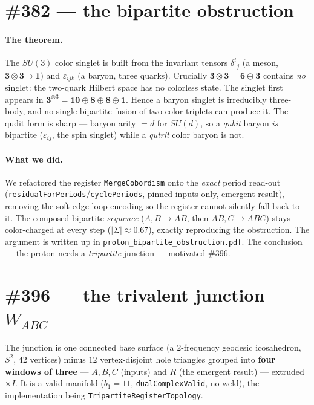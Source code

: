 \documentclass[11pt]{article}
\newcommand{\rep}[1]{\mathbf{#1}}
\newcommand{\triv}{\mathbf{1}}
\newcommand{\Sg}{\Sigma}
\newcommand{\code}[1]{\texttt{#1}}
\begin{document}
\section{\#382 --- the bipartite obstruction}

\paragraph{The theorem.} The $SU(3)$ color singlet is built from the invariant
tensors $\delta^i{}_j$ (a meson, $\rep 3\otimes\bar{\rep 3}\supset\triv$) and
$\varepsilon_{ijk}$ (a baryon, three quarks). Crucially
$\rep 3\otimes\rep 3=\rep 6\oplus\bar{\rep 3}$ contains \emph{no} singlet: the
two-quark Hilbert space has no colorless state. The singlet first appears in
$\rep 3^{\otimes 3}=\rep{10}\oplus\rep 8\oplus\rep 8\oplus\triv$. Hence a baryon
singlet is irreducibly three-body, and no single bipartite fusion of two color
triplets can produce it. The qudit form is sharp --- baryon arity $=d$ for
$SU(d)$, so a \emph{qubit} baryon \emph{is} bipartite ($\varepsilon_{ij}$, the
spin singlet) while a \emph{qutrit} color baryon is not.

\paragraph{What we did.} We refactored the register \code{MergeCobordism} onto the
\emph{exact} period read-out (\code{residualForPeriods}/\code{cyclePeriods}, pinned
inputs only, emergent result), removing the soft edge-loop encoding so the register
cannot silently fall back to it. The composed bipartite \emph{sequence}
($A,B\!\to\!AB$, then $AB,C\!\to\!ABC$) stays color-charged at every step
($|\Sg|\approx 0.67$), exactly reproducing the obstruction. The argument is
written up in \code{proton\_bipartite\_obstruction.pdf}. The conclusion --- the
proton needs a \emph{tripartite} junction --- motivated \#396.

\section{\#396 --- the trivalent junction $W_{ABC}$}

The junction is one connected base surface (a $2$-frequency geodesic icosahedron,
$S^2$, $42$ vertices) minus $12$ vertex-disjoint hole triangles grouped into
\textbf{four windows of three} --- $A,B,C$ (inputs) and $R$ (the emergent result)
--- extruded $\times I$. It is a valid manifold ($b_1=11$, \code{dualComplexValid},
no weld), the implementation being \code{TripartiteRegisterTopology}.
\end{document}
